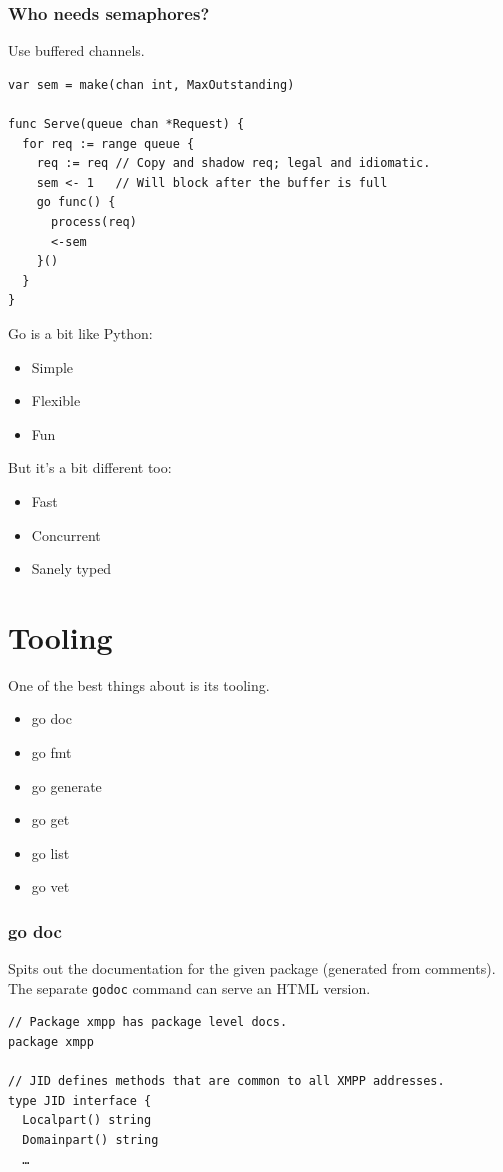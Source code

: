 \documentclass[xelatex,aspectratio=169]{beamer}
\begin{document}
\begin{frame}[fragile]
	\frametitle{Who needs semaphores?}
	Use buffered channels.
\tiny
\begin{verbatim}
var sem = make(chan int, MaxOutstanding)

func Serve(queue chan *Request) {
  for req := range queue {
    req := req // Copy and shadow req; legal and idiomatic.
    sem <- 1   // Will block after the buffer is full
    go func() {
      process(req)
      <-sem
    }()
  }
}
\end{verbatim}
\end{frame}

\begin{frame}
	Go is a bit like Python:
	\begin{itemize}
			\item Simple
			\item Flexible
			\item Fun
	\end{itemize}
	But it's a bit different too:
	\begin{itemize}
			\item Fast
			\item Concurrent
			\item Sanely typed
	\end{itemize}
\end{frame}


\section[]{Tooling}
\frame{\sectionpage}

\begin{frame}
	\begin{flushleft}
		One of the best things about is its tooling.
	\end{flushleft}
	\begin{itemize}
		\item go doc
		\item go fmt
		\item go generate
		\item go get
		\item go list
		\item go vet
	\end{itemize}
\end{frame}

\begin{frame}[fragile]
	\frametitle{go doc}
	\begin{flushleft}
		Spits out the documentation for the given package (generated from comments).
		The separate \texttt{godoc} command can serve an HTML version.
	\end{flushleft}
	\renewcommand{\fcolorbox}[4][]{#4}
\begin{verbatim}
// Package xmpp has package level docs.
package xmpp

// JID defines methods that are common to all XMPP addresses.
type JID interface {
  Localpart() string
  Domainpart() string
  …
\end{verbatim}
\end{frame}
\end{document}
